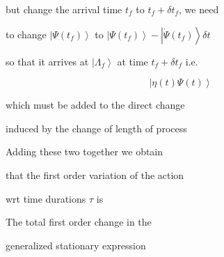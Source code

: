 \documentclass[aps,preprint]{revtex4}
\begin{document}
but change the arrival time $t_{f}$ to $t_{f}+\delta t_{f}$, we need

to change $\left| \Psi \left( t_{f}\right) \right\rangle $ to $\left| \Psi
\left( t_{f}\right) \right\rangle -\left| \dot{\Psi}\left( t_{f}\right)
\right\rangle \delta t$

so that it arrives at $\left| \Lambda _{f}\right\rangle $ at time $%
t_{f}+\delta t_{f}$ i.e.

\begin{equation}
\left| \eta \left( t\right) \Psi \left( t\right) \right\rangle
\end{equation}

which must be added to the direct change

induced by the change of length of process

Adding these two together we obtain

that the first order variation of the action

wrt time durations $\tau $ is

The total first order change in the

generalized stationary expression
\end{document}
